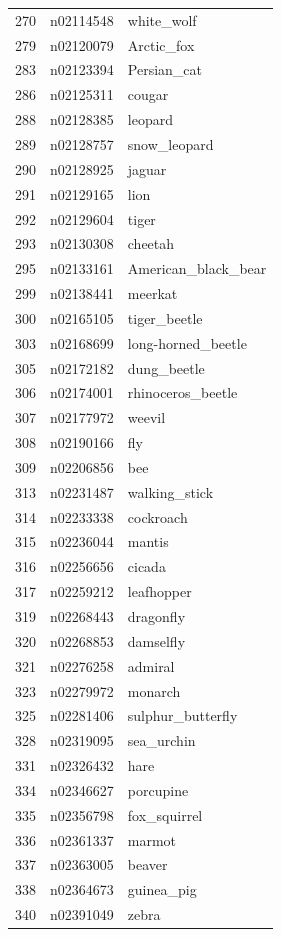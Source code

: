 \begin{table}
\begin{tabular}{cll}
270 & n02114548 & white_wolf \\
279 & n02120079 & Arctic_fox \\
283 & n02123394 & Persian_cat \\
286 & n02125311 & cougar \\
288 & n02128385 & leopard \\
289 & n02128757 & snow_leopard \\
290 & n02128925 & jaguar \\
291 & n02129165 & lion \\
292 & n02129604 & tiger \\
293 & n02130308 & cheetah \\
295 & n02133161 & American_black_bear \\
299 & n02138441 & meerkat \\
300 & n02165105 & tiger_beetle \\
303 & n02168699 & long-horned_beetle \\
305 & n02172182 & dung_beetle \\
306 & n02174001 & rhinoceros_beetle \\
307 & n02177972 & weevil \\
308 & n02190166 & fly \\
309 & n02206856 & bee \\
313 & n02231487 & walking_stick \\
314 & n02233338 & cockroach \\
315 & n02236044 & mantis \\
316 & n02256656 & cicada \\
317 & n02259212 & leafhopper \\
319 & n02268443 & dragonfly \\
320 & n02268853 & damselfly \\
321 & n02276258 & admiral \\
323 & n02279972 & monarch \\
325 & n02281406 & sulphur_butterfly \\
328 & n02319095 & sea_urchin \\
331 & n02326432 & hare \\
334 & n02346627 & porcupine \\
335 & n02356798 & fox_squirrel \\
336 & n02361337 & marmot \\
337 & n02363005 & beaver \\
338 & n02364673 & guinea_pig \\
340 & n02391049 & zebra \\

\end{tabular}
\end{table}

